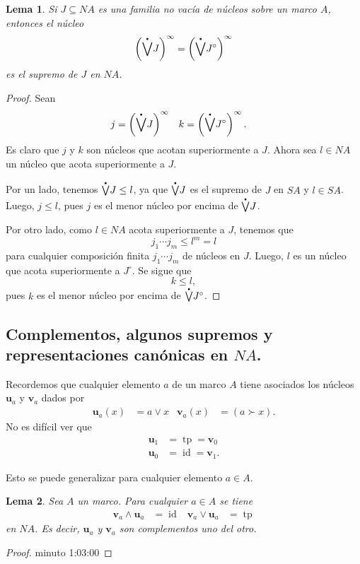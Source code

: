 \documentclass[12pt,letterpaper,titlepage]{article}
\newtheorem*{lemma}{Lema}
\theoremstyle{definition}
\renewcommand\sup{\vee}
\renewcommand\inf{\wedge}
\newcommand\pSup{%
    {\stackrel{\raisebox{-3pt}{\scalebox{0.5}{$\bullet$}}}{\bigvee}}
  }%
\newcommand\unuc[1]{\mathbf u_{#1}}
\newcommand\vnuc[1]{\mathbf v_{#1}}
\newcommand\tps[1]{\texorpdfstring{#1}{}}
\newcommand\<{\langle}
\renewcommand\>{\rangle}
\DeclareMathOperator{\id}{id}
\DeclareMathOperator{\tp}{tp}
\begin{document}
\begin{lemma}
  Si $J\subseteq NA$ es una familia no vacía de núcleos sobre un
  marco $A$, entonces el núcleo
  \[
    \left(\pSup J\right)^\infty = \left(\pSup J^\circ\right)^\infty
  \]
  es el supremo de $J$ en $NA$.
\end{lemma}
\begin{proof}
  Sean
  \begin{align*}
    j &= \left(\pSup J\right)^\infty &
    k &= \left(\pSup J^\circ\right)^\infty.
  \end{align*}
  Es claro que $j$ y $k$ son núcleos que acotan superiormente a
  $J$.
  Ahora sea $l\in NA$ un núcleo que acota superiormente a $J$.

  Por un lado, tenemos $\pSup J\leq l$, ya que $\pSup J$
  es el supremo de $J$ en $SA$ y $l\in SA$.
  Luego, $j\leq l$, pues $j$ es el menor núcleo por encima de
  $\pSup J$.

  Por otro lado, como $l\in NA$ acota superiormente a $J$,
  tenemos que
  \[
    j_1\cdots j_m \leq l^m = l
  \]
  para cualquier composición finita $j_1\cdots j_m$ de núcleos en
  $J$.
  Luego, $l$ es un núcleo que acota superiormente a $J^\circ$.
  Se sigue que
  \[
    k \leq l
  ,\]
  pues $k$ es el menor núcleo por encima de
  $\pSup J^\circ$.
\end{proof}

\subsection{Complementos, algunos supremos y representaciones canónicas en \tps{$NA$}.}

Recordemos que cualquier elemento $a$ de un marco $A$ tiene
asociados los núcleos $\unuc a$ y $\vnuc a$ dados por
\begin{align*}
  \unuc a(x) &= a\sup x
  &
  \vnuc a(x) &= (a\succ x).
\end{align*}
No es difícil ver que
\begin{align*}
  \unuc 1 &= \tp = \vnuc 0 \\
  \unuc 0 &= \id = \vnuc 1.
\end{align*}

Esto se puede generalizar para cualquier elemento $a\in A$.

\begin{lemma}
  Sea $A$ un marco.
  Para cualquier $a\in A$ se tiene
  \begin{align*}
    \vnuc a\inf\unuc a &= \id
    &
    \vnuc a\sup\unuc a &= \tp
  \end{align*}
  en $NA$.
  Es decir, $\unuc a$ y $\vnuc a$ son complementos uno del otro.
\end{lemma}
\begin{proof}
  minuto 1:03:00
\end{proof}
\end{document}
